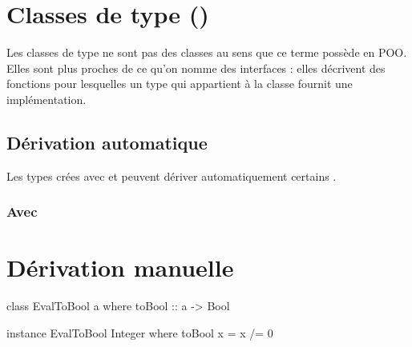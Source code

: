 \section{ Classes de type ()}
\label{typeclasses}

Les classes de type ne sont pas des classes au sens que ce terme possède en POO.
Elles sont plus proches de ce qu'on nomme des interfaces : elles décrivent des fonctions pour lesquelles un type qui appartient à la classe fournit une implémentation.

\subsection{Dérivation automatique}

Les types crées avec  et  peuvent dériver automatiquement certains .

\subsubsection{Avec }

\section{Dérivation manuelle}

\begin{haskellcode}
class EvalToBool a where
    toBool :: a -> Bool

instance EvalToBool Integer where
    toBool x = x /= 0
\end{haskellcode}
